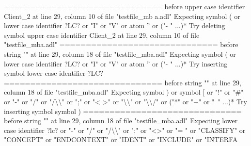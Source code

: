 {  \newline
  ==============================\newline
  \newline
  before upper case identifier Client\_2 at line 29, column 10 of file "testfile\_mb\newline
  a.adl"\newline
  Expecting symbol ( or lower case identifier ?LC? or "I" or "V" or atom '' or ("-\newline
  " ...)*\newline
  Try deleting symbol upper case identifier Client\_2 at line 29, column 10 of file\newline
   "testfile\_mba.adl"\newline
  \newline
  ==============================\newline
  \newline
  before string "" at line 29, column 18 of file "testfile\_mba.adl"\newline
  Expecting symbol ( or lower case identifier ?LC? or "I" or "V" or atom '' or ("-\newline
  " ...)*\newline
  Try inserting symbol lower case identifier ?LC?\newline
  \newline
  ==============================\newline
  \newline
  before string "" at line 29, column 18 of file "testfile\_mba.adl"\newline
  Expecting symbol ) or symbol [ or "!" or "\#" or "-" or "/" or "/\textbackslash{}\textbackslash{}" or ";" or "<\newline
  >" or "\textbackslash{}\textbackslash{}" or "\textbackslash{}\textbackslash{}/" or ("*" or "+" or "~" ...)*\newline
  Try inserting symbol symbol )\newline
  \newline
  ==============================\newline
  \newline
  before string "" at line 29, column 18 of file "testfile\_mba.adl"\newline
  Expecting lower case identifier ?lc? or "-" or "/" or "/\textbackslash{}\textbackslash{}" or ";" or "<>" or "=\newline
  " or "CLASSIFY" or "CONCEPT" or "ENDCONTEXT" or "IDENT" or "INCLUDE" or "INTERFA\newline
}
